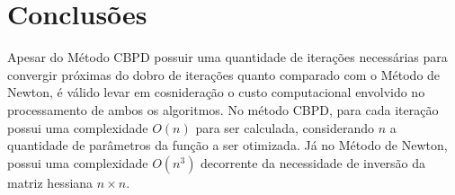 \section{Conclusões}


Apesar do Método CBPD possuir uma quantidade de iterações necessárias para convergir próximas do dobro de iterações quanto comparado com o Método de Newton, é válido levar em cosnideração o custo computacional envolvido no processamento de ambos os algoritmos. No método CBPD, para cada iteração possui uma complexidade $O(n)$ para ser calculada, considerando $n$ a quantidade de parâmetros da função a ser otimizada. Já no Método de Newton, possui uma complexidade $O(n^3)$ decorrente da necessidade de inversão da matriz hessiana $n \times n$.
